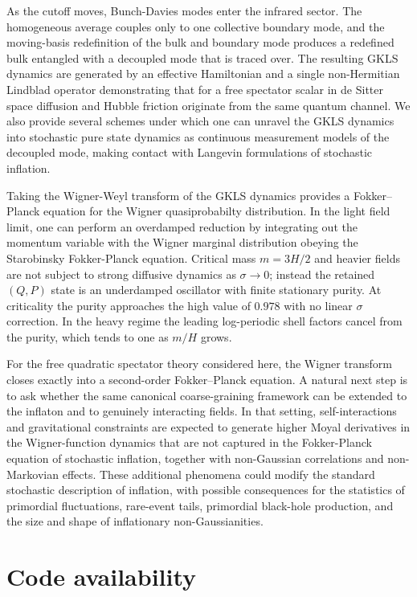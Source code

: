 \documentclass{article}
\numberwithin{equation}{section}
\begin{document}
	As the cutoff moves, Bunch-Davies modes enter the infrared sector. The homogeneous average couples only to one collective boundary mode, and the moving-basis redefinition of the bulk and boundary mode produces a redefined bulk entangled with a decoupled mode that is traced over. The resulting GKLS dynamics are generated by an effective Hamiltonian and a single non-Hermitian Lindblad operator demonstrating that for a free spectator scalar in de Sitter space diffusion and Hubble friction originate from the same quantum channel. We also provide several schemes under which one can unravel the GKLS dynamics into stochastic pure state dynamics as continuous measurement models of the decoupled mode, making contact with Langevin formulations of stochastic inflation.

	Taking the Wigner-Weyl transform of the GKLS dynamics provides a Fokker--Planck equation for the Wigner quasiprobabilty distribution. In the light field limit, one can perform an overdamped reduction by integrating out the momentum variable with the Wigner marginal distribution obeying the Starobinsky Fokker-Planck equation. Critical mass $m=3H/2$ and heavier fields are not subject to strong diffusive dynamics as \(\sigma\to0\); instead the retained \((Q,P)\) state is an underdamped oscillator with finite stationary purity. At criticality the purity approaches the high value of \(0.978\) with no linear \(\sigma\) correction. In the heavy regime the leading log-periodic shell factors cancel from the purity, which tends to one as \(m/H\) grows.

	For the free quadratic spectator theory considered here, the Wigner transform closes exactly into a second-order Fokker--Planck equation. A natural next step is to ask whether the same canonical coarse-graining framework can be extended to the inflaton and to genuinely interacting fields. In that setting, self-interactions and gravitational constraints are expected to generate higher Moyal derivatives in the Wigner-function dynamics that are not captured in the Fokker-Planck equation of stochastic inflation, together with non-Gaussian correlations and non-Markovian effects. These additional phenomena could modify the standard stochastic description of inflation, with possible consequences for the statistics of primordial fluctuations, rare-event tails, primordial black-hole production, and the size and shape of inflationary non-Gaussianities.

	\section{Code availability}
\end{document}
